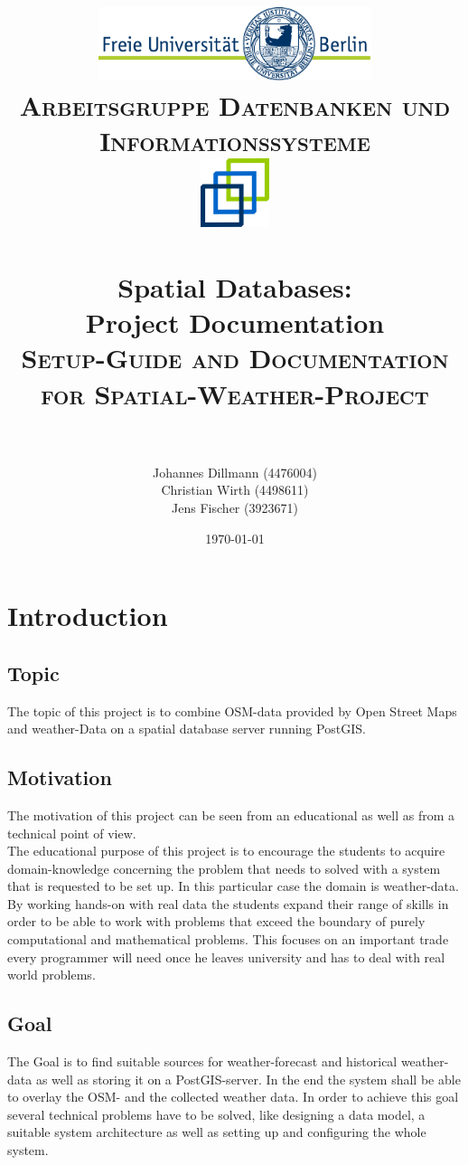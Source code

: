 \documentclass[paper=a4, fontsize=11pt]{article} %
\title{
\normalfont \normalsize
\textsc{\includegraphics[width=0.6\textwidth]{pictures/logo} \\ [5pt] Arbeitsgruppe Datenbanken und Informationssysteme \\ [20pt] \includegraphics[width=0.15\textwidth]{pictures/DBIS_Logo_rgb_web.png}} \\ [10pt] %
\horrule{0.5pt} \\[0.4cm] %
\huge Spatial Databases:\\ Project Documentation \\ [0.15cm] %
\normalsize \textsc{Setup-Guide and Documentation for Spatial-Weather-Project} \\ [0.4cm]
\horrule{2pt} \\[0.5cm] %
}
\author{Johannes Dillmann (4476004) \\ Christian Wirth (4498611) \\ Jens Fischer (3923671)}
\date{\normalsize\today} %
\numberwithin{equation}{section} %
\numberwithin{figure}{section} %
\numberwithin{table}{section} %
\begin{document}
\begin{titlepage}
\maketitle
\thispagestyle{empty}
\end{titlepage}

\newpage
\setcounter{page}{1}
\tableofcontents

\newpage
\listoffigures
{}

\newpage
{}
\pagestyle{fancy}
\setcounter{page}{1}

\section{Introduction}
	\subsection{Topic}
	The topic of this project is to combine OSM-data provided by Open Street Maps and weather-Data on a spatial database server running PostGIS.
	\subsection{Motivation}
	The motivation of this project can be seen from an educational as well as from a technical point of view.\\
	The educational purpose of this project is to encourage the students to acquire domain-knowledge concerning the problem that needs to solved with a system that is requested to be set up. In this particular case the domain is weather-data. By working hands-on with real data the students expand their range of skills in order to be able to work with problems that exceed the boundary of purely computational and mathematical problems. This focuses on an important trade every programmer will need once he leaves university and has to deal with real world problems.\\
	\subsection{Goal}
	The Goal is to find suitable sources for weather-forecast and historical weather-data as well as storing it on a PostGIS-server. In the end the system shall be able to overlay the OSM- and the collected weather data. In order to achieve this goal several technical problems have to be solved, like designing a data model, a suitable system architecture as well as setting up and configuring the whole system.
\end{document}
